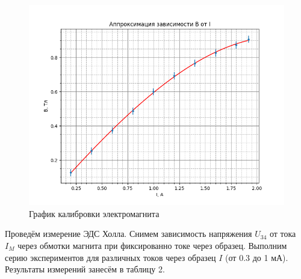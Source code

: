 \documentclass[a4paper]{article}
\begin{document}
\FloatBarrier

    \begin{figure}[h]
    \centering
    \includegraphics[width=15cm]{curve.png}
    \caption{График калибровки электромагнита}
    \label{fig:cal}
\end{figure}

\FloatBarrier
    
     Проведём измерение ЭДС Холла. Снимем зависимость напряжения $U_{34}$ от тока $I_M$ через обмотки магнита при фиксированно токе через образец. Выполним серию экспериментов для различных токов через образец $I$ (от 0.3 до 1 мА). Результаты измерений занесём в таблицу 2.
    
\end{document}
